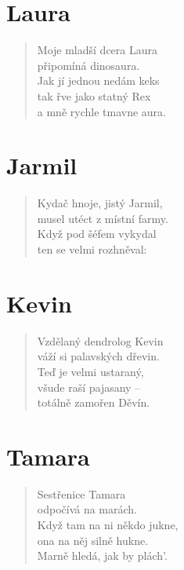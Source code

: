 \section*{Laura}
\begin{verse}
Moje mladší dcera Laura\\
připomíná dinosaura.\\
Jak jí jednou nedám keks\\
tak řve jako statný Rex\\
a mně rychle tmavne aura.
\end{verse}

\section*{Jarmil}
\begin{verse}
Kydač hnoje, jistý Jarmil,\\
musel utéct z místní farmy.\\
Když pod šéfem vykydal\\
ten se velmi rozhněval:\\
\end{verse}

\section*{Kevin}
\begin{verse}
Vzdělaný dendrolog Kevin\\
váží si palavských dřevin.\\
Teď je velmi ustaraný,\\
všude raší pajasany --\\
totálně zamořen Děvín.
\end{verse}

\section*{Tamara}
\begin{verse}
Sestřenice Tamara\\
odpočívá na marách.\\
Když tam na ni někdo jukne,\\
ona na něj silně hukne.\\
Marně hledá, jak by plách'.	
\end{verse}

